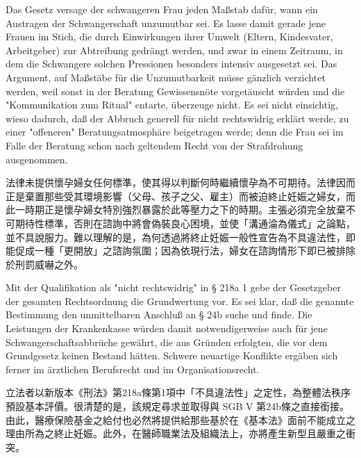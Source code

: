\documentclass[12pt]{article}
\begin{document}
\begin{sourcepara}[title={原文C.3}]
Das Gesetz versage der schwangeren Frau jeden Maßstab dafür, wann ein Austragen der Schwangerschaft unzumutbar sei. Es lasse damit gerade jene Frauen im Stich, die durch Einwirkungen ihrer Umwelt (Eltern, Kindesvater, Arbeitgeber) zur Abtreibung gedrängt werden, und zwar in einem Zeitraum, in dem die Schwangere solchen Pressionen besonders intensiv ausgesetzt sei. Das Argument, auf Maßstäbe für die Unzumutbarkeit müsse gänzlich verzichtet werden, weil sonst in der Beratung Gewissensnöte vorgetäuscht würden und die "Kommunikation zum Ritual" entarte, überzeuge nicht. Es sei nicht einsichtig, wieso dadurch, daß der Abbruch generell für nicht rechtswidrig erklärt werde, zu einer "offeneren" Beratungsatmosphäre beigetragen werde; denn die Frau sei im Falle der Beratung schon nach geltendem Recht von der Strafdrohung ausgenommen.
\end{sourcepara}
\begin{transpara}
法律未提供懷孕婦女任何標準，使其得以判斷何時繼續懷孕為不可期待。法律因而正是棄置那些受其環境影響（父母、孩子之父、雇主）而被迫終止妊娠之婦女，而此一時期正是懷孕婦女特別強烈暴露於此等壓力之下的時期。主張必須完全放棄不可期待性標準，否則在諮詢中將會偽裝良心困境，並使「溝通淪為儀式」之論點，並不具說服力。難以理解的是，為何透過將終止妊娠一般性宣告為不具違法性，即能促成一種「更開放」之諮詢氛圍；因為依現行法，婦女在諮詢情形下即已被排除於刑罰威嚇之外。
\end{transpara}

\begin{sourcepara}[title={原文C.4}]
Mit der Qualifikation als "nicht rechtswidrig" in § 218a \abbrAbs{} 1 \abbrStGB{} \abbrNF{} gebe der Gesetzgeber der gesamten Rechtsordnung die Grundwertung vor. Es sei klar, daß die genannte Bestimmung den unmittelbaren Anschluß an § 24b \abbrSGBV{} suche und finde. Die Leistungen der Krankenkasse würden damit notwendigerweise auch für jene Schwangerschaftsabbrüche gewährt, die aus Gründen erfolgten, die vor dem Grundgesetz keinen Bestand hätten. Schwere neuartige Konflikte ergäben sich ferner im ärztlichen Berufsrecht und im Organisationsrecht.
\end{sourcepara}
\begin{transpara}
立法者以新版本《刑法》第218a條第1項中「不具違法性」之定性，為整體法秩序預設基本評價。很清楚的是，該規定尋求並取得與 SGB V 第24b條之直接銜接。由此，醫療保險基金之給付也必然將提供給那些基於在《基本法》面前不能成立之理由所為之終止妊娠。此外，在醫師職業法及組織法上，亦將產生新型且嚴重之衝突。
\end{transpara}
\end{document}

